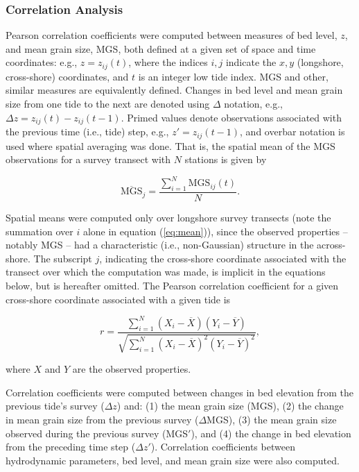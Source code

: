 \documentclass[jmse,article,submit,pdftex,moreauthors]{Definitions/mdpi}
\begin{document}
\subsubsection{Correlation Analysis}\label{Methods:Correlation}

Pearson correlation coefficients were computed between measures of bed level, $z$, and mean grain size, MGS, both defined at a given set of space and time coordinates: e.g., $z=z_{ij}(t)$, where the indices $i,j$ indicate the $x,y$ (longshore, cross-shore) coordinates, and $t$ is an integer low tide index. MGS and other, similar measures are equivalently defined. Changes in bed level and mean grain size from one tide to the next are denoted using $\Delta$ notation, e.g., $\Delta z = z_{ij}(t) - z_{ij}(t-1)$. Primed values denote observations associated with the previous time (i.e., tide) step, e.g., $z'=z_{ij}(t-1)$, and overbar notation is used where spatial averaging was done. That is, the spatial mean of the MGS observations for a survey transect with $N$ stations is given by 

\begin{equation}\label{eq:mean}
\overline{\mathrm{MGS}}_j = \frac{\sum_{i=1}^{N} \mathrm{MGS}_{ij}(t)}{N}. 
\end{equation}

\noindent Spatial means were computed only over longshore survey transects (note the summation over $i$ alone in equation (\ref{eq:mean})), since the observed properties -- notably MGS -- had a characteristic (i.e., non-Gaussian) structure in the across-shore. The subscript $j$, indicating the cross-shore coordinate associated with the transect over which the computation was made, is implicit in the equations below, but is hereafter omitted. The Pearson correlation coefficient for a given cross-shore coordinate associated with a given tide is

\begin{equation}\label{eq:pearsons_r}
r = \frac{\sum_{i=1}^{N}(X_i-\overline{X})(Y_i-\overline{Y})}{\sqrt{\sum_{i=1}^{N}(X_i-\overline{X})^2 (Y_i-\overline{Y})^2}},
\end{equation}

\noindent where $X$ and $Y$ are the observed properties.

Correlation coefficients were computed between changes in bed elevation from the previous tide's survey ($\Delta z$) and: (1) the mean grain size (MGS), (2) the change in mean grain size from the previous survey ($\Delta$MGS), (3) the mean grain size observed during the previous survey (MGS$'$), and (4) the change in bed elevation from the preceding time step ($\Delta z'$). Correlation coefficients between hydrodynamic parameters, bed level, and mean grain size were also computed. 
\end{document}
